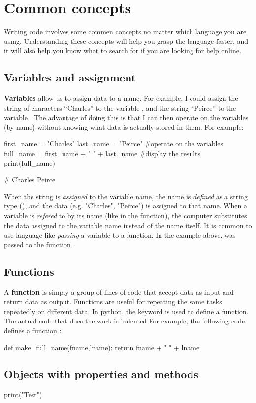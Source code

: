 \section{Common concepts}

Writing code involves some commen concepts no matter which language you are using. Understanding these concepts will help you grasp the language faster, and it will also help you know what to search for if you are looking for help online.

\subsection{Variables and assignment}

\textbf{Variables} allow us to assign data to a name. For example, I could assign the string of characters ``Charles'' to the variable , and the string ``Peirce'' to the variable . The advantage of doing this is that I can then operate on the variables (by name) without knowing what data is actually stored in them. For example:

\begin{pycode}
    first_name = "Charles"
    last_name = "Peirce"
    #operate on the variables
    full_name = first_name + " " + last_name
    #display the results
    print(full_name)

    # Charles Peirce
\end{pycode}

When the string is \textit{assigned} to the variable name, the name is \textit{defined} as a string type (), and the data (e.g. "Charles", "Peirce") is assigned to that name. When a variable is \textit{refered} to by its name (like in the  function), the computer substitutes the data assigned to the variable name instead of the name itself. It is common to use language like \textit{passing} a variable to a function. In the example above,  was passed to the function .

\subsection{Functions}

A \textbf{function} is simply a group of lines of code that accept data as input and return data as output. Functions are useful for repeating the same tasks repeatedly on different data. In python, the  keyword is used to define a function. The actual code that does the work is indented For example, the following code defines a function :

\begin{pycode}
    def make_full_name(fname,lname):
    return fname + " " + lname
\end{pycode}

\subsection{Objects with properties and methods}

\begin{pycode}
    print("Test")
\end{pycode}


